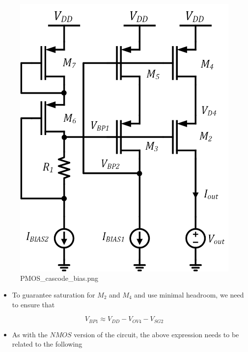 \documentclass[11pt]{article}
\providecommand{\tightlist}{%
      \setlength{\itemsep}{0pt}\setlength{\parskip}{0pt}}
\begin{document}
    \begin{figure}
\centering
\includegraphics{PMOS_cascode_bias.png}
\caption{PMOS\_cascode\_bias.png}
\end{figure}

    \begin{itemize}
\tightlist
\item
  To guarantee saturation for \(M_2\) and \(M_4\) and use minimal
  headroom, we need to ensure that
\end{itemize}

\begin{equation}
V_{BP1} \approx V_{DD} - V_{OV4} - V_{SG2}
\end{equation}

\begin{itemize}
\tightlist
\item
  As with the \(NMOS\) version of the circuit, the above expression
  needs to be related to the following
\end{itemize}
\end{document}
